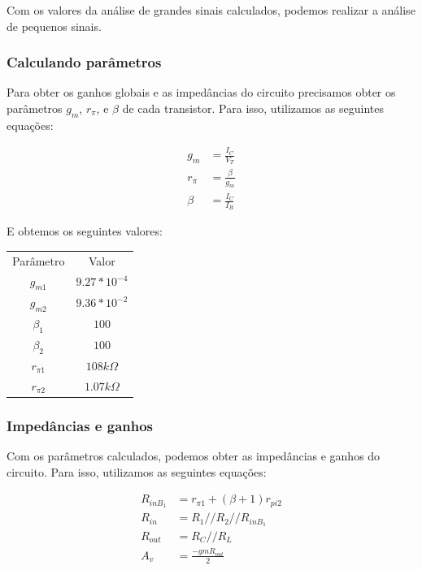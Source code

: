 Com os valores da análise de grandes sinais calculados, podemos realizar a análise de pequenos sinais.

\subsubsection{Calculando parâmetros}

Para obter os ganhos globais e as impedâncias do circuito precisamos obter os parâmetros $g_m$, $r_{\pi}$, e $\beta$ de cada transistor. Para isso, utilizamos as seguintes equações:

\begin{equation}
    \begin{aligned}
        g_m     & = \frac{I_C}{V_T}   \\
        r_{\pi} & = \frac{\beta}{g_m} \\
        \beta   & = \frac{I_C}{I_B}
    \end{aligned}
\end{equation}

E obtemos os seguintes valores:

\begin{center}
    \begin{tabular}{ |c|c| }
        \hline
        Parâmetro   & Valor               \\
        $g_{m1}$    & $9.27 * 10^{-4}$    \\
        $g_{m2}$    & $9.36 * 10^{-2}$    \\
        $\beta_1$   & $100$               \\
        $\beta_2$   & $100$               \\
        $r_{\pi 1}$ & $108 k \varOmega  $ \\
        $r_{\pi 2}$ & $1.07 k \varOmega$  \\
        \hline
    \end{tabular}
\end{center}

\subsubsection{Impedâncias e ganhos}

Com os parâmetros calculados, podemos obter as impedâncias e ganhos do circuito. Para isso, utilizamos as seguintes equações:

\begin{equation}
    \begin{aligned}
        R_{inB_1} & = r_{\pi 1} + (\beta + 1) r_{pi2} \\
        R_{in}    & = R_1 // R_2 // R_{inB_1}         \\
        R_{out}   & = R_C // R_L                      \\
        A_v       & = \frac{-gm R_{out}}{2}
    \end{aligned}
\end{equation}

